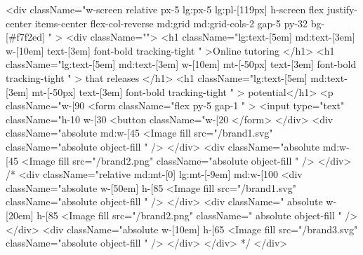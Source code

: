 <div className="w-screen  relative px-5 lg:px-5 lg:pl-[119px] h-screen flex justify-center items-center flex-col-reverse md:grid md:grid-cols-2 gap-5 py-32 bg-[#f7f2ed] " >
          <div className="">
            <h1 className="lg:text-[5em] md:text-[3em] w-[10em]  text-[3em] font-bold tracking-tight  " >Online tutoring </h1> <h1 className="lg:text-[5em] md:text-[3em] w-[10em] mt-[-50px] text-[3em] font-bold tracking-tight  " > that releases </h1> <h1 className="lg:text-[5em] md:text-[3em] mt-[-50px] text-[3em] font-bold tracking-tight  " > potential</h1>
            <p className="w-[90%
            <form className="flex py-5 gap-1 " >
              <input type="text" className="h-10 w-[30%
              <button className="w-[20%
            </form>
          </div>
          <div className="absolute md:w-[45%
            <Image
              fill
              src={"/brand1.svg"}
              className="absolute  object-fill "
            />
          </div>
          <div className="absolute  md:w-[45%
            <Image
              fill
              src={"/brand2.png"}
              className="absolute  object-fill "
            />
          </div>
          {/* <div className="relative md:mt-[0] lg:mt-[-9em] md:w-[100%
            <div className="absolute w-[50em] h-[85%
              <Image
                fill
                src={"/brand1.svg"}
                className="absolute  object-fill "
              />
            </div>
            <div className=" absolute w-[20em] h-[85%
              <Image
                fill
                src={"/brand2.png"}
                className="  absolute  object-fill "
              />
            </div>
            <div className="absolute w-[10em] h-[65%
              <Image
                fill
                src={"/brand3.svg"}
                className="absolute object-fill "
              />
            </div>
          </div> */}
        </div>

